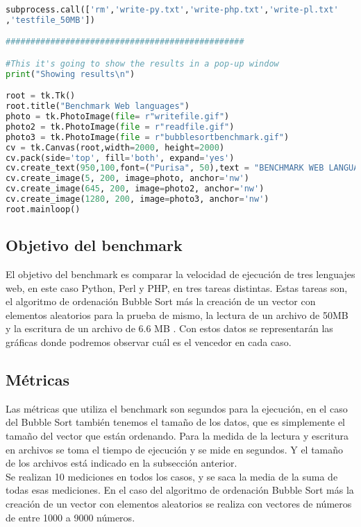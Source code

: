 \begin{lstlisting}[language=python]
subprocess.call(['rm','write-py.txt','write-php.txt','write-pl.txt'
,'testfile_50MB'])

################################################

#This it's going to show the results in a pop-up window
print("Showing results\n")

root = tk.Tk()
root.title("Benchmark Web languages")
photo = tk.PhotoImage(file= r"writefile.gif")
photo2 = tk.PhotoImage(file = r"readfile.gif")
photo3 = tk.PhotoImage(file = r"bubblesortbenchmark.gif")
cv = tk.Canvas(root,width=2000, height=2000)
cv.pack(side='top', fill='both', expand='yes')
cv.create_text(950,100,font=("Purisa", 50),text = "BENCHMARK WEB LANGUAGES")
cv.create_image(5, 200, image=photo, anchor='nw')
cv.create_image(645, 200, image=photo2, anchor='nw')
cv.create_image(1280, 200, image=photo3, anchor='nw')
root.mainloop()


\end{lstlisting}

\subsection{Objetivo del benchmark}
El objetivo del benchmark es comparar la velocidad de ejecución de tres lenguajes web, en este caso Python, Perl y PHP, en tres tareas distintas. Estas tareas son, el algoritmo de ordenación Bubble Sort más la creación de un vector con elementos aleatorios para la prueba de mismo, la lectura de un archivo de 50MB y la escritura de un archivo de 6.6 MB . Con estos datos se representarán las gráficas donde podremos observar cuál es el vencedor en cada caso. 
\subsection{Métricas}
Las métricas que utiliza el benchmark son segundos para la ejecución, en el caso del Bubble Sort también tenemos el tamaño de los datos, que es simplemente el tamaño del vector que están ordenando. Para la medida de la lectura y escritura en archivos se toma el tiempo de ejecución y se mide en segundos. Y el tamaño de los archivos está indicado en la subsección anterior.\\ 
Se realizan 10 mediciones en todos los casos, y se saca la media de la suma de todas esas mediciones. En el caso del algoritmo de ordenación Bubble Sort más la creación de un vector con elementos aleatorios se realiza con vectores de números de entre 1000 a 9000 números.
